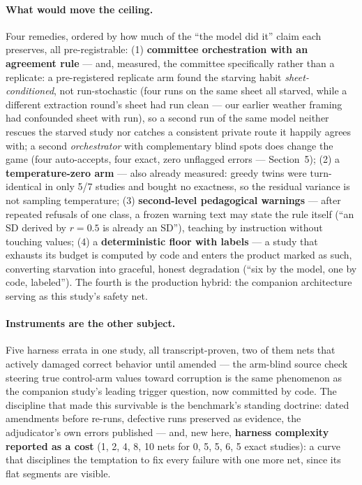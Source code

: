 \documentclass[11pt]{article}
\begin{document}
\paragraph{What would move the ceiling.} Four remedies, ordered by how much of the ``the model did it'' claim each preserves, all pre-registrable: (1) \textbf{committee orchestration with an agreement rule} --- and, measured, the committee specifically rather than a replicate: a pre-registered replicate arm found the starving habit \emph{sheet-conditioned}, not run-stochastic (four runs on the same sheet all starved, while a different extraction round's sheet had run clean --- our earlier weather framing had confounded sheet with run), so a second run of the same model neither rescues the starved study nor catches a consistent private route it happily agrees with; a second \emph{orchestrator} with complementary blind spots does change the game (four auto-accepts, four exact, zero unflagged errors --- Section~5); (2) a \textbf{temperature-zero arm} --- also already measured: greedy twins were turn-identical in only 5/7 studies and bought no exactness, so the residual variance is not sampling temperature; (3) \textbf{second-level pedagogical warnings} --- after repeated refusals of one class, a frozen warning text may state the rule itself (``an SD derived by $r{=}0.5$ is already an SD''), teaching by instruction without touching values; (4) a \textbf{deterministic floor with labels} --- a study that exhausts its budget is computed by code and enters the product marked as such, converting starvation into graceful, honest degradation (``six by the model, one by code, labeled''). The fourth is the production hybrid: the companion architecture serving as this study's safety net.

\paragraph{Instruments are the other subject.} Five harness errata in one study, all transcript-proven, two of them nets that actively damaged correct behavior until amended --- the arm-blind source check steering true control-arm values toward corruption is the same phenomenon as the companion study's leading trigger question, now committed by code. The discipline that made this survivable is the benchmark's standing doctrine: dated amendments before re-runs, defective runs preserved as evidence, the adjudicator's own errors published --- and, new here, \textbf{harness complexity reported as a cost} (1, 2, 4, 8, 10 nets for 0, 5, 5, 6, 5 exact studies): a curve that disciplines the temptation to fix every failure with one more net, since its flat segments are visible.
\end{document}
